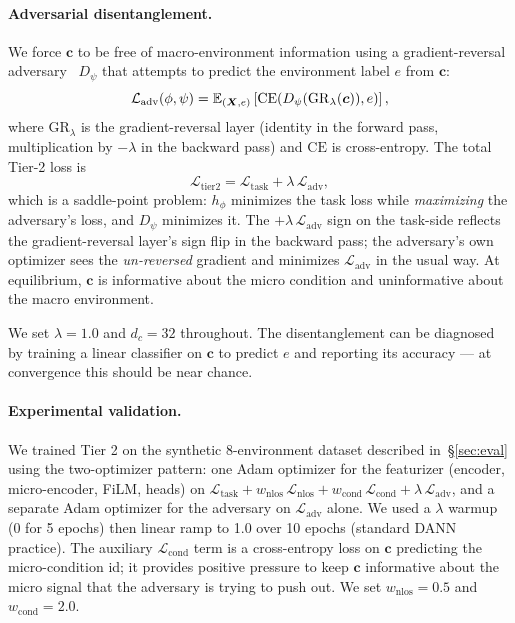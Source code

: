 \paragraph{Adversarial disentanglement.}
We force $\bm{c}$ to be free of macro-environment information
using a gradient-reversal adversary~\cite{dann2016} $D_\psi$ that
attempts to predict the environment label $e$ from $\bm{c}$:
\begin{equation}
  \mathcal{L}_{\mathrm{adv}}(\phi, \psi)
  = \mathbb{E}_{(\bm{X}, e)} \left[
    \mathrm{CE}(D_\psi(\mathrm{GR}_\lambda(\bm{c})), e)
  \right],
  \label{eq:adv}
\end{equation}
where $\mathrm{GR}_\lambda$ is the gradient-reversal layer
(identity in the forward pass, multiplication by $-\lambda$ in
the backward pass) and $\mathrm{CE}$ is cross-entropy. The total
Tier-2 loss is
\begin{equation}
  \mathcal{L}_{\mathrm{tier2}} =
  \mathcal{L}_{\mathrm{task}} + \lambda \, \mathcal{L}_{\mathrm{adv}},
  \label{eq:tier2}
\end{equation}
which is a saddle-point problem: $h_\phi$ minimizes the task loss
while \emph{maximizing} the adversary's loss, and $D_\psi$
minimizes it. The $+\lambda\,\mathcal{L}_{\mathrm{adv}}$ sign on the
task-side reflects the gradient-reversal layer's sign flip in the
backward pass; the adversary's own optimizer sees the
\emph{un-reversed} gradient and minimizes $\mathcal{L}_{\mathrm{adv}}$
in the usual way. At equilibrium, $\bm{c}$ is informative about the
micro condition and uninformative about the macro environment.

We set $\lambda = 1.0$ and $d_c = 32$ throughout. The
disentanglement can be diagnosed by training a linear classifier
on $\bm{c}$ to predict $e$ and reporting its accuracy --- at
convergence this should be near chance.

\paragraph{Experimental validation.}
We trained Tier 2 on the synthetic 8-environment dataset described
in~\S\ref{sec:eval} using the two-optimizer pattern: one Adam
optimizer for the featurizer (encoder, micro-encoder, FiLM, heads)
on $\mathcal{L}_{\mathrm{task}} + w_{\mathrm{nlos}}\,\mathcal{L}_{\mathrm{nlos}}
+ w_{\mathrm{cond}}\,\mathcal{L}_{\mathrm{cond}} + \lambda\,\mathcal{L}_{\mathrm{adv}}$,
and a separate Adam optimizer for the adversary on
$\mathcal{L}_{\mathrm{adv}}$ alone. We used a $\lambda$ warmup
(0 for 5 epochs) then linear ramp to 1.0 over 10 epochs
(standard DANN practice). The auxiliary $\mathcal{L}_{\mathrm{cond}}$
term is a cross-entropy loss on $\bm{c}$ predicting the
micro-condition id; it provides positive pressure to keep
$\bm{c}$ informative about the micro signal that the adversary
is trying to push out. We set $w_{\mathrm{nlos}} = 0.5$ and
$w_{\mathrm{cond}} = 2.0$.

